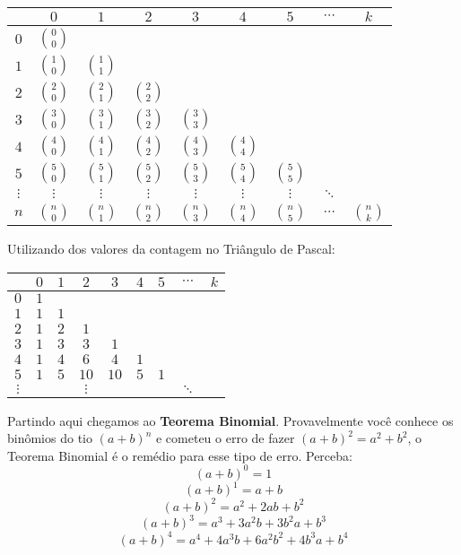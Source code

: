 \documentclass[a4paper,11pt]{book}
\theoremstyle{definition}
\theoremstyle{break}
\begin{document}
\begin{center}
\begin{tabular}{c|cccccccc}
        &$0$& $1$ & $2$ & $3$ & $4$ & $5$ & $\cdots$ & $k$ \\
\hline
$0$     & $0 \choose 0$ \\
$1$     & $1 \choose 0$ & $1 \choose 1$ \\
$2$     & $2 \choose 0$ & $2 \choose 1$ & $2 \choose 2$ \\
$3$     & $3 \choose 0$ & $3 \choose 1$ & $3 \choose 2$ & $3 \choose 3$ \\
$4$     & $4 \choose 0$ & $4 \choose 1$ & $4 \choose 2$ & $4 \choose 3$ & $4 \choose 4$ \\
$5$     & $5 \choose 0$ & $5 \choose 1$ & $5 \choose 2$ & $5 \choose 3$ & $5 \choose 4$ & $5 \choose 5$ \\
$\vdots$&$\vdots$&$\vdots$&$\vdots$&$\vdots$&$\vdots$&$\vdots$&$\ddots$\\
$n$     & $n \choose 0$ & $n \choose 1$& $n \choose 2$& $n \choose 3$& $n \choose 4$& $n \choose 5$&$\cdots$ & $n \choose k$\\

\end{tabular}
\end{center}
Utilizando dos valores da contagem no Triângulo de Pascal:
\begin{center}
\begin{tabular}{c|cccccccc}
        &$0$& $1$ & $2$ & $3$ & $4$ & $5$ & $\cdots$ & $k$ \\
\hline
$0$     & $1$ \\
$1$     & $1$ & $1$ \\
$2$     & $1$& $2$ & $1$ \\
$3$     & $1$ & $3$ & $3$ & $1$ \\
$4$     & $1$ & $4$ & $6$ & $4$ & $1$ \\
$5$     & $1$ & $5$ & $10$ & $10$ & $5$ & $1$ \\
$\vdots$&     &     &$\vdots$&    &     & &$\ddots$ 
\end{tabular}
\end{center}
Partindo aqui chegamos ao \textbf{Teorema Binomial}. Provavelmente você conhece os binômios do tio $(a+b)^n$ e cometeu o erro de fazer $(a+b)^2 = a^2 + b^2$, o Teorema Binomial é o remédio para esse tipo de erro. Perceba:
\newpage
$$(a+b)^0 = 1$$
$$(a+b)^1 =  a + b$$
$$(a+b)^2 = a^2 + 2ab + b^2$$
$$(a+b)^3 = a^3 + 3a^2b + 3b^2a +b^3$$
$$(a+b)^4 = a^4 + 4a^3b + 6a^2b^2 + 4b^3a +b^4$$
\\
\end{document}
